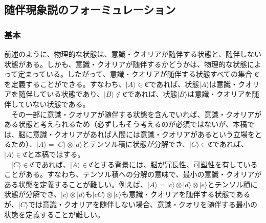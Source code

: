\subsection{随伴現象説のフォーミュレーション}
\subsubsection{基本}
前述のように、物理的な状態は、意識・クオリアが随伴する状態と、随伴しない状態がある。しかも、意識・クオリアが随伴するかどうかは、物理的な状態によって定まっている。したがって、意識・クオリアが随伴する状態すべての集合 $\mathfrak{C}$ を定義することができる。すなわち、$|A\rangle \in \mathfrak{C}$であれば、状態$|A\rangle$は意識・クオリアを随伴している状態であり、$|B\rangle \notin \mathfrak{C}$であれば、状態$|B\rangle$は意識・クオリアを随伴していない状態である。\\
　その一部に意識・クオリアが随伴する状態を含んでいれば、意識・クオリアがある状態と考えられるため（必ずしもそう考えるのが必須ではないが、本稿では、脳に意識・クオリアがあれば人間には意識・クオリアがあるという立場をとるため）、$|A\rangle = |C\rangle \otimes |d\rangle$とテンソル積に状態が分解でき、$|C\rangle\in\mathfrak{C}$であれば、$|A\rangle\in\mathfrak{C}$と本稿ではする。\\
　$|C\rangle\in\mathfrak{C}$であれば、$|A\rangle\in\mathfrak{C}$とする背景には、脳が冗長性、可塑性を有していることがある。すなわち、テンソル積への分解の意味で、最小の意識・クオリアがある状態を定義することが難しい。例えば、$|A\rangle = |c\rangle \otimes |d\rangle \otimes |e\rangle$とテンソル積に状態が分解でき、$|c\rangle \otimes |d\rangle$も$|cC\rangle \otimes |e\rangle$も意識・クオリアを随伴する状態であるが、$|C\rangle$では意識・クオリアを随伴しない場合、意識・クオリを随伴する最小の状態を定義することが難しい。